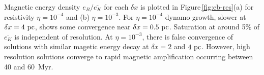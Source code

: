 \documentclass[preprint2]{aastex63}
\newcommand\pc{~ {\rm pc}}
\newcommand\dx{ {\delta x}}
\begin{document}
 Magnetic energy density $e_B/\overline{e_K}$ for each $\dx$ is plotted in
 Figure\,\ref{fig:eb-res}(a) for resistivity $\eta=10^{-4}$ and (b) 
 $\eta=10^{-3}$.
 For $\eta=10^{-4}$ dynamo growth, slower at $\dx=4\pc$, shows some
 convergence near $\dx=0.5\pc$.
 Saturation at around 5\% of $\overline{e_K}$ is independent of resolution.
 At $\eta=10^{-3}$, there is false convergence \citep{FMA91} of solutions with
 similar magetic energy decay at $\dx=2$ and $4\pc$.
 However, high resolution solutions converge to rapid magnetic
 amplification occurring between 40 and 60~Myr.
 
\end{document}
